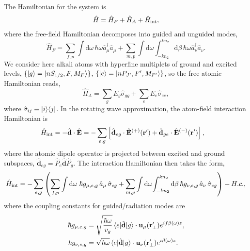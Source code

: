 \documentclass[preprint, aps,pra,onecolumn]{revtex4-1} %
\newcommand{\inter}{{\rm int}}
\begin{document}
The Hamiltonian for the system is
\begin{equation}
\hat{H} = \hat{H}_F+\hat{H}_A + \hat{H}_{\inter},
\end{equation}
where the free-field Hamiltonian decomposes into guided and unguided modes, 
	\begin{equation}
		\hat{H}_F = \sum_{f,p}\int \mathrm{d}\omega \, \hbar \omega \hat{a}^\dagger_\mu \hat{a}_\mu 
+\sum_{m,p} \int \mathrm{d}\omega  \int_{-k n_2}^{k n_2} \mathrm{d}\beta \, \hbar \omega 
\hat{a}^\dagger_\nu \hat{a}_\nu.
	\end{equation}
We consider here alkali atoms with hyperfine multiplets of ground and excited levels, $\{ \lvert{g}\rangle=\lvert{nS_{1/2}, F, M_F}\rangle\}$, $\{ \lvert{e}\rangle =\lvert{nP_{J'}, F', M_{F'}}\rangle\}$, so the free atomic Hamiltonian reads,
	\begin{equation}
		\hat{H}_A  = \sum_g E_g \hat{\sigma}_{gg} + \sum_e E_e \hat{\sigma}_{ee},
	\end{equation}
where $\hat{\sigma}_{ij} \equiv \lvert{i}\rangle\langle{j}\rvert$.  In the rotating wave approximation, the atom-field interaction Hamiltonian is
	\begin{align}
		\hat{H}_{\inter} &= -\hat{\mathbf{d}}\cdot \hat{\mathbf{E}} =- \sum_{e,g} \left[ \hat{\mathbf{d}}_{eg}\cdot 
\hat{\mathbf{E}}^{(+)}(\br')+\hat{\mathbf{d}}_{ge}\cdot \hat{\mathbf{E}}^{(-)}(\br') \right],
	\end{align}
where the atomic dipole operator is projected between excited and ground subspaces, $\hat{\mathbf{d}}_{eg}= \hat{P}_e \hat{\mathbf{d}} \hat{P}_g $. The interaction Hamiltonian then takes the form, 
\begin{equation}
	\hat{H}_{\inter} = -\sum_{e,g} \left(\sum_{f,p} \int\mathrm{d}\omega \; \hbar g_{\mu, e,g}\, \hat{a}_\mu  \, 
		\hat{\sigma}_{eg}+ \sum_{m,p} \int\mathrm{d}\omega \! \int_{-kn_2}^{kn_2}\mathrm{d}\beta \,  \hbar 
g_{\nu, e,g}\, \hat{a}_\nu \, \hat{\sigma}_{eg}\right) + {H.c.},
	\end{equation}
where the coupling constants for guided/radiation modes are
\begin{subequations} \label{Eq::CouplingConstants}
	\begin{align}
		\hbar g_{\mu, e,g} &= \sqrt{\frac{\hbar \omega}{ v_g  }}\, \langle{e}\rvert \hat{\mathbf{d}} \lvert{g}\rangle 
\cdot\mathbf{u}_\mu ( \mathbf{r}'_\perp ) e^{i f \beta(\omega)z} , \\
		\hbar g_{\nu, e,g} &= \sqrt{  \hbar \omega } \, \langle{e}\rvert \hat{\mathbf{d}} \lvert{g}\rangle \cdot \mathbf{u}_\nu ( \mathbf{r}'_\perp) e^{i\beta(\omega)z}  .
	\end{align}
\end{subequations}
\end{document}
